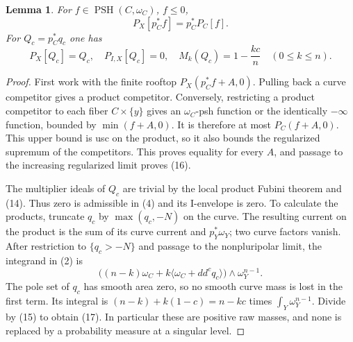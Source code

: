 \documentclass[11pt]{article}
\newtheorem{lemma}[theorem]{Lemma}
\newcommand{\PSH}{\operatorname{PSH}}
\newcommand{\ddc}{dd^c}
\begin{document}
\begin{lemma}\label{product}
For $f\in\PSH(C,\omega_C)$, $f\le0$,
\[
 P_X[p_C^*f]=p_C^*P_C[f].                                  \tag{16}
\]
For $Q_c=p_C^*q_c$ one has
\[
 P_X[Q_c]=Q_c,\quad P_{I,X}[Q_c]=0,\quad
 M_k(Q_c)=1-\frac{k c}{n}\quad(0\le k\le n).                \tag{17}
\]
\end{lemma}
\begin{proof}
First work with the finite rooftop $P_X(p_C^*f+A,0)$.
Pulling back a curve competitor gives a product competitor.
Conversely, restricting a product competitor to each fiber
$C\times\{y\}$ gives an $\omega_C$-psh function or the identically
$-\infty$ function, bounded by $\min(f+A,0)$. It is therefore at
most $P_C(f+A,0)$. This upper bound is usc on the product, so it
also bounds the regularized supremum of the competitors. This
proves equality for every $A$, and passage to the increasing
regularized limit proves (16).

The multiplier ideals of $Q_c$ are trivial by the local product
Fubini theorem and (14). Thus zero is admissible in (4) and its
I-envelope is zero. To calculate the products, truncate $q_c$ by
$\max(q_c,-N)$ on the curve. The resulting current on the product
is the sum of its curve current and $p_Y^*\omega_Y$; two curve
factors vanish. After restriction to $\{q_c>-N\}$ and passage
to the nonpluripolar limit, the integrand in (2) is
\[
 \big((n-k)\omega_C+k\langle\omega_C+\ddc q_c\rangle\big)
                       \wedge\omega_Y^{n-1}.               \tag{18}
\]
The pole set of $q_c$ has smooth area zero, so no smooth curve
mass is lost in the first term. Its integral is
$(n-k)+k(1-c)=n-kc$ times $\int_Y\omega_Y^{n-1}$.
Divide by (15) to obtain (17). In particular these are positive
raw masses, and none is replaced by a probability measure at a
singular level.
\end{proof}
\end{document}
